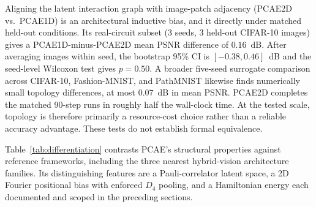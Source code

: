 \documentclass[pdflatex,sn-basic]{sn-jnl}
\DeclareRobustCommand{\blue}[1]{\leavevmode{\color{blue}#1}}
\begin{document}
Aligning the latent interaction graph with image-patch adjacency (PCAE2D vs.\ PCAE1D) is an architectural inductive bias, and \blue{we test} it directly under matched held-out conditions. Its real-circuit subset (3 seeds, 3 held-out CIFAR-10 images) gives a PCAE1D-minus-PCAE2D mean PSNR difference of $0.16$~dB. After averaging images within seed, the bootstrap 95\% CI is $[-0.38,0.46]$~dB and the seed-level Wilcoxon test gives $p=0.50$. A broader five-seed surrogate comparison across CIFAR-10, Fashion-MNIST, and PathMNIST likewise finds numerically small topology differences, at most $0.07$~dB in mean PSNR. PCAE2D completes the matched 90-step runs in roughly half the wall-clock time. At the tested scale, topology is therefore primarily a resource-cost choice rather than a reliable accuracy advantage. These tests do not establish formal equivalence.

Table~\ref{tab:differentiation} contrasts PCAE's structural properties against reference frameworks, including the three nearest hybrid-vision architecture families. Its distinguishing features are a Pauli-correlator latent space, a 2D Fourier positional bias with enforced $D_4$ pooling, and a Hamiltonian energy \blue{term,} each documented and scoped in the preceding sections.
\end{document}
